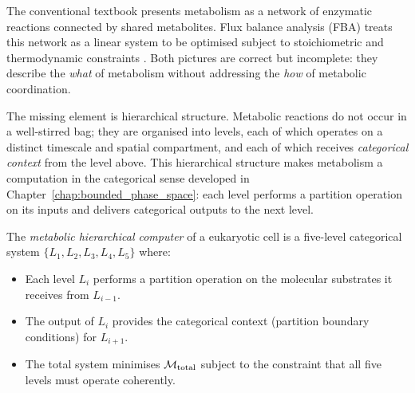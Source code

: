 The conventional textbook presents metabolism as a network of enzymatic
reactions connected by shared metabolites. Flux balance analysis (FBA)
treats this network as a linear system to be optimised subject to
stoichiometric and thermodynamic constraints \citep{Orth2010}. Both
pictures are correct but incomplete: they describe the \emph{what} of
metabolism without addressing the \emph{how} of metabolic coordination.

The missing element is hierarchical structure. Metabolic reactions do not
occur in a well-stirred bag; they are organised into levels, each of which
operates on a distinct timescale and spatial compartment, and each of which
receives \emph{categorical context} from the level above. This hierarchical
structure makes metabolism a computation in the categorical sense developed
in Chapter~\ref{chap:bounded_phase_space}: each level performs a partition
operation on its inputs and delivers categorical outputs to the next level.

\begin{definition}
\label{def:metabolic_computer}
The \emph{metabolic hierarchical computer} of a eukaryotic cell is a
five-level categorical system $\{L_1, L_2, L_3, L_4, L_5\}$ where:
\begin{itemize}
  \item Each level $L_i$ performs a partition operation on the molecular
        substrates it receives from $L_{i-1}$.
  \item The output of $L_i$ provides the categorical context (partition
        boundary conditions) for $L_{i+1}$.
  \item The total system minimises $\mathcal{M}_{\mathrm{total}}$ subject to
        the constraint that all five levels must operate coherently.
\end{itemize}
\end{definition}

